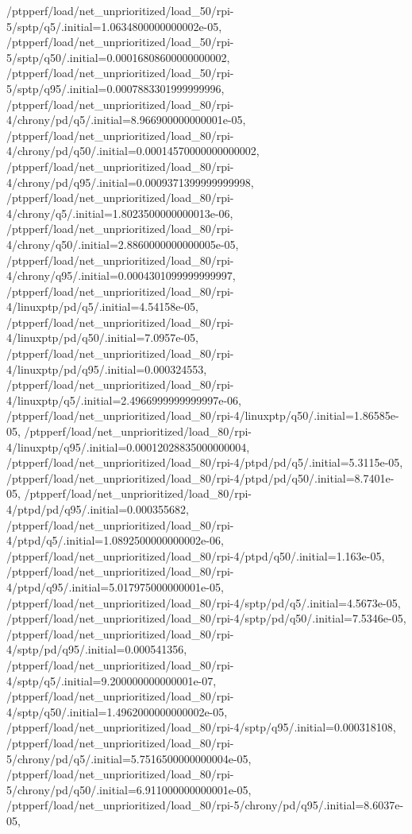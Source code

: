 {    /ptpperf/load/net_unprioritized/load_50/rpi-5/sptp/q5/.initial=1.0634800000000002e-05,
    /ptpperf/load/net_unprioritized/load_50/rpi-5/sptp/q50/.initial=0.00016808600000000002,
    /ptpperf/load/net_unprioritized/load_50/rpi-5/sptp/q95/.initial=0.0007883301999999996,
    /ptpperf/load/net_unprioritized/load_80/rpi-4/chrony/pd/q5/.initial=8.966900000000001e-05,
    /ptpperf/load/net_unprioritized/load_80/rpi-4/chrony/pd/q50/.initial=0.00014570000000000002,
    /ptpperf/load/net_unprioritized/load_80/rpi-4/chrony/pd/q95/.initial=0.0009371399999999998,
    /ptpperf/load/net_unprioritized/load_80/rpi-4/chrony/q5/.initial=1.8023500000000013e-06,
    /ptpperf/load/net_unprioritized/load_80/rpi-4/chrony/q50/.initial=2.8860000000000005e-05,
    /ptpperf/load/net_unprioritized/load_80/rpi-4/chrony/q95/.initial=0.0004301099999999997,
    /ptpperf/load/net_unprioritized/load_80/rpi-4/linuxptp/pd/q5/.initial=4.54158e-05,
    /ptpperf/load/net_unprioritized/load_80/rpi-4/linuxptp/pd/q50/.initial=7.0957e-05,
    /ptpperf/load/net_unprioritized/load_80/rpi-4/linuxptp/pd/q95/.initial=0.000324553,
    /ptpperf/load/net_unprioritized/load_80/rpi-4/linuxptp/q5/.initial=2.4966999999999997e-06,
    /ptpperf/load/net_unprioritized/load_80/rpi-4/linuxptp/q50/.initial=1.86585e-05,
    /ptpperf/load/net_unprioritized/load_80/rpi-4/linuxptp/q95/.initial=0.00012028835000000004,
    /ptpperf/load/net_unprioritized/load_80/rpi-4/ptpd/pd/q5/.initial=5.3115e-05,
    /ptpperf/load/net_unprioritized/load_80/rpi-4/ptpd/pd/q50/.initial=8.7401e-05,
    /ptpperf/load/net_unprioritized/load_80/rpi-4/ptpd/pd/q95/.initial=0.000355682,
    /ptpperf/load/net_unprioritized/load_80/rpi-4/ptpd/q5/.initial=1.0892500000000002e-06,
    /ptpperf/load/net_unprioritized/load_80/rpi-4/ptpd/q50/.initial=1.163e-05,
    /ptpperf/load/net_unprioritized/load_80/rpi-4/ptpd/q95/.initial=5.017975000000001e-05,
    /ptpperf/load/net_unprioritized/load_80/rpi-4/sptp/pd/q5/.initial=4.5673e-05,
    /ptpperf/load/net_unprioritized/load_80/rpi-4/sptp/pd/q50/.initial=7.5346e-05,
    /ptpperf/load/net_unprioritized/load_80/rpi-4/sptp/pd/q95/.initial=0.000541356,
    /ptpperf/load/net_unprioritized/load_80/rpi-4/sptp/q5/.initial=9.200000000000001e-07,
    /ptpperf/load/net_unprioritized/load_80/rpi-4/sptp/q50/.initial=1.4962000000000002e-05,
    /ptpperf/load/net_unprioritized/load_80/rpi-4/sptp/q95/.initial=0.000318108,
    /ptpperf/load/net_unprioritized/load_80/rpi-5/chrony/pd/q5/.initial=5.7516500000000004e-05,
    /ptpperf/load/net_unprioritized/load_80/rpi-5/chrony/pd/q50/.initial=6.911000000000001e-05,
    /ptpperf/load/net_unprioritized/load_80/rpi-5/chrony/pd/q95/.initial=8.6037e-05,
}
